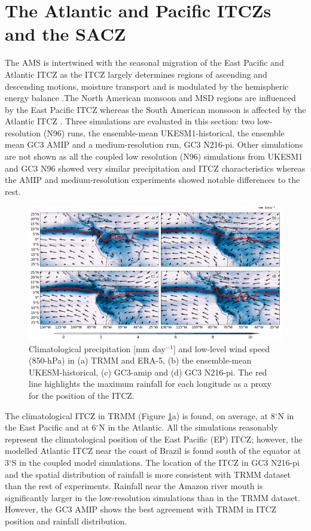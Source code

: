 \section{The Atlantic and Pacific ITCZs and the SACZ}\label{sq:itcz}



The AMS is intertwined with the seasonal migration of the East Pacific and Atlantic ITCZ as the ITCZ largely determines regions of ascending and descending motions, moisture transport and is modulated by the hemispheric energy balance \citep{oueslati2013,li2014,zhou2016,cai2019pantropical}.The North American monsoon and MSD regions are influenced by the East Pacific ITCZ whereas the South American monsoon is affected by the Atlantic ITCZ \citep{yoon2010atlantic,marengo2012}. 
Three simulations are evaluated in this section: two low-resolution (N96) runs, the ensemble-mean UKESM1-historical, the ensemble mean GC3 AMIP and a medium-resolution run, GC3 N216-pi.
Other simulations are not shown as all the coupled low resolution (N96) simulations from UKESM1 and GC3 N96 showed very similar precipitation and ITCZ characteristics whereas the AMIP and medium-resolution experiments showed notable differences to the rest. 


\begin{figure}[t!]
\centering
 \includegraphics[width=\linewidth]{figures/itcz_clim_d.png}
\caption[Climatological precipitation and ITCZ position]{ Climatological precipitation [mm day$^{-1}$] and low-level wind speed (850-hPa) in (a) TRMM and ERA-5, (b) the ensemble-mean UKESM-historical, (c) GC3-amip and (d) GC3 N216-pi. The red line highlights the maximum rainfall for each longitude as a proxy for the position of the ITCZ.  }
\label{fig:3}
\end{figure}

The climatological ITCZ in TRMM (Figure \ref{fig:3}a) is found, on average, at 8$^\circ$N in the East Pacific and at 6$^\circ$N in the Atlantic.
All the simulations reasonably represent the climatological position of the East Pacific (EP) ITCZ; however, the modelled Atlantic ITCZ near the coast of Brazil is found south of the equator at 3$^\circ$S in the coupled model simulations.
The location of the ITCZ in GC3 N216-pi and the spatial distribution of rainfall is more consistent with TRMM dataset than the rest of experiments.
Rainfall near the Amazon river mouth is significantly larger in the low-resolution simulations than in the TRMM dataset. 
 However, the GC3 AMIP shows the best agreement with TRMM in ITCZ position and rainfall distribution. 

